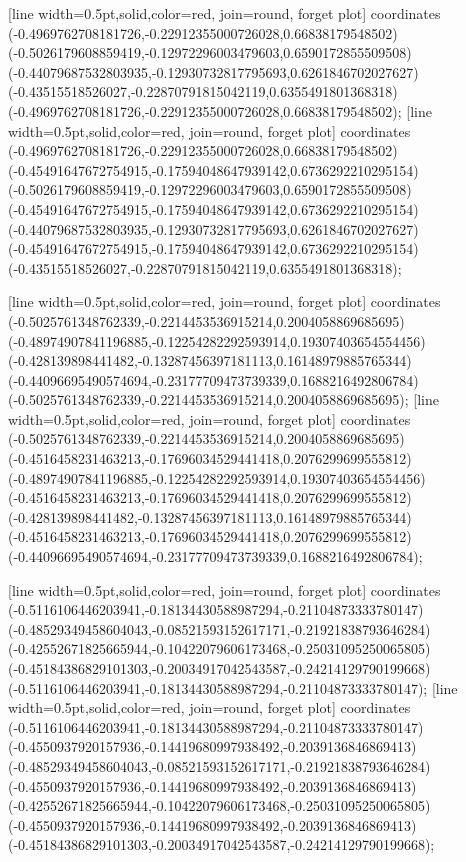 [line width=0.5pt,solid,color=red, join=round, forget plot] coordinates {(-0.4969762708181726,-0.22912355000726028,0.66838179548502) (-0.5026179608859419,-0.12972296003479603,0.6590172855509508) (-0.44079687532803935,-0.12930732817795693,0.6261846702027627) (-0.43515518526027,-0.22870791815042119,0.6355491801368318) (-0.4969762708181726,-0.22912355000726028,0.66838179548502)};
[line width=0.5pt,solid,color=red, join=round, forget plot] coordinates {(-0.4969762708181726,-0.22912355000726028,0.66838179548502) (-0.45491647672754915,-0.17594048647939142,0.6736292210295154) (-0.5026179608859419,-0.12972296003479603,0.6590172855509508) (-0.45491647672754915,-0.17594048647939142,0.6736292210295154) (-0.44079687532803935,-0.12930732817795693,0.6261846702027627) (-0.45491647672754915,-0.17594048647939142,0.6736292210295154) (-0.43515518526027,-0.22870791815042119,0.6355491801368318)};

[line width=0.5pt,solid,color=red, join=round, forget plot] coordinates {(-0.5025761348762339,-0.2214453536915214,0.2004058869685695) (-0.48974907841196885,-0.12254282292593914,0.19307403654554456) (-0.428139898441482,-0.13287456397181113,0.16148979885765344) (-0.44096695490574694,-0.23177709473739339,0.1688216492806784) (-0.5025761348762339,-0.2214453536915214,0.2004058869685695)};
[line width=0.5pt,solid,color=red, join=round, forget plot] coordinates {(-0.5025761348762339,-0.2214453536915214,0.2004058869685695) (-0.4516458231463213,-0.17696034529441418,0.2076299699555812) (-0.48974907841196885,-0.12254282292593914,0.19307403654554456) (-0.4516458231463213,-0.17696034529441418,0.2076299699555812) (-0.428139898441482,-0.13287456397181113,0.16148979885765344) (-0.4516458231463213,-0.17696034529441418,0.2076299699555812) (-0.44096695490574694,-0.23177709473739339,0.1688216492806784)};

[line width=0.5pt,solid,color=red, join=round, forget plot] coordinates {(-0.5116106446203941,-0.18134430588987294,-0.21104873333780147) (-0.48529349458604043,-0.08521593152617171,-0.21921838793646284) (-0.42552671825665944,-0.10422079606173468,-0.25031095250065805) (-0.45184386829101303,-0.20034917042543587,-0.24214129790199668) (-0.5116106446203941,-0.18134430588987294,-0.21104873333780147)};
[line width=0.5pt,solid,color=red, join=round, forget plot] coordinates {(-0.5116106446203941,-0.18134430588987294,-0.21104873333780147) (-0.4550937920157936,-0.14419680997938492,-0.2039136846869413) (-0.48529349458604043,-0.08521593152617171,-0.21921838793646284) (-0.4550937920157936,-0.14419680997938492,-0.2039136846869413) (-0.42552671825665944,-0.10422079606173468,-0.25031095250065805) (-0.4550937920157936,-0.14419680997938492,-0.2039136846869413) (-0.45184386829101303,-0.20034917042543587,-0.24214129790199668)};

